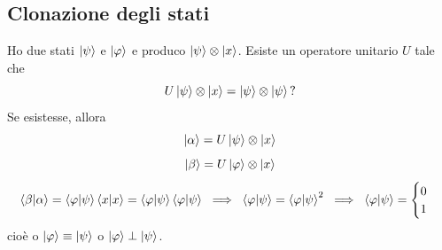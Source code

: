 \subsection{Clonazione degli stati}
Ho due stati \(\ket{\psi}\) e \(\ket{\varphi}\) e produco \(\ket{\psi} \otimes \ket{x}\). Esiste un operatore unitario \(U\) tale che
\[
U \ket{\psi} \otimes \ket{x} = \ket{\psi} \otimes \ket{\psi} \text{?}
\]
Se esistesse, allora
\[
\ket{\alpha} = U \ket{\psi} \otimes \ket{x}
\]
\[
\ket{\beta} = U \ket{\varphi} \otimes \ket{x}
\]
\[
\braket{\beta|\alpha} = \braket{\varphi|\psi} \braket{x|x} = \braket{\varphi|\psi} \braket{\varphi|\psi} \; \implies \; \braket{\varphi|\psi} = \braket{\varphi|\psi}^2 \; \implies \; \braket{\varphi|\psi} = \begin{cases}
0 \\
1
\end{cases}
\]
cioè o \(\ket{\varphi} \equiv \ket{\psi}\) o \( \ket{\varphi} \perp \ket{\psi}\).